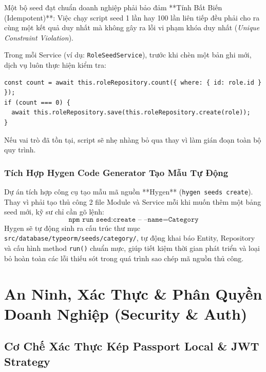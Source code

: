 \documentclass[12pt,a4paper,oneside]{book}
\begin{document}
\begin{infobox}
  Một bộ seed đạt chuẩn doanh nghiệp phải bảo đảm **Tính Bất Biến (Idempotent)**: Việc chạy script seed 1 lần hay 100 lần liên tiếp đều phải cho ra cùng một kết quả duy nhất mà không gây ra lỗi vi phạm khóa duy nhất (\textit{Unique Constraint Violation}).
  
  Trong mỗi Service (ví dụ: \texttt{RoleSeedService}), trước khi chèn một bản ghi mới, dịch vụ luôn thực hiện kiểm tra:
\begin{Verbatim}[fontsize=\small]
const count = await this.roleRepository.count({ where: { id: role.id } });
if (count === 0) {
  await this.roleRepository.save(this.roleRepository.create(role));
}
\end{Verbatim}
  Nếu vai trò đã tồn tại, script sẽ nhẹ nhàng bỏ qua thay vì làm gián đoạn toàn bộ quy trình.
\end{infobox}

\section{Tích Hợp Hygen Code Generator Tạo Mẫu Tự Động}
Dự án tích hợp công cụ tạo mẫu mã nguồn **Hygen** (\texttt{hygen seeds create}). Thay vì phải tạo thủ công 2 file Module và Service mỗi khi muốn thêm một bảng seed mới, kỹ sư chỉ cần gõ lệnh:
\begin{equation}
  \texttt{npm run seed:create -- --name=Category}
\end{equation}
Hygen sẽ tự động sinh ra cấu trúc thư mục \texttt{src/database/typeorm/seeds/category/}, tự động khai báo Entity, Repository và cấu hình method \texttt{run()} chuẩn mực, giúp tiết kiệm thời gian phát triển và loại bỏ hoàn toàn các lỗi thiếu sót trong quá trình sao chép mã nguồn thủ công.

\part{An Ninh, Xác Thực \& Phân Quyền Doanh Nghiệp (Security \& Auth)}

\chapter{Cơ Chế Xác Thực Kép Passport Local \& JWT Strategy}
\end{document}
